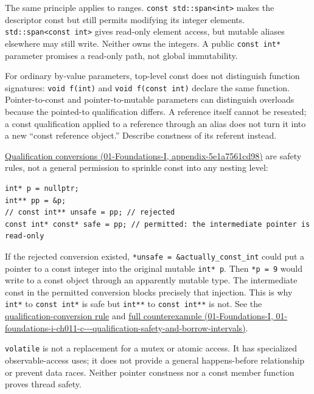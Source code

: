 The same principle applies to ranges. \texttt{const\ std::span\textless{}int\textgreater{}} makes the descriptor const but still permits modifying its integer elements. \texttt{std::span\textless{}const\ int\textgreater{}} gives read-only element access, but mutable aliases elsewhere may still write. Neither owns the integers. A public \texttt{const\ int*} parameter promises a read-only path, not global immutability.

For ordinary by-value parameters, top-level const does not distinguish function signatures: \texttt{void\ f(int)} and \texttt{void\ f(const\ int)} declare the same function. Pointer-to-const and pointer-to-mutable parameters can distinguish overloads because the pointed-to qualification differs. A reference itself cannot be reseated; a const qualification applied to a reference through an alias does not turn it into a new ``const reference object.'' Describe constness of its referent instead.

\href{../01-Foundations-I/main.pdf\#nameddest=appendix-5e1a7561cd98}{Qualification conversions (01-Foundations-I, appendix-5e1a7561cd98)} are safety rules, not a general permission to sprinkle const into any nesting level:

\begin{verbatim}
int* p = nullptr;
int** pp = &p;
// const int** unsafe = pp; // rejected
const int* const* safe = pp; // permitted: the intermediate pointer is read-only
\end{verbatim}

If the rejected conversion existed, \texttt{*unsafe\ =\ \&actually\_const\_int} could put a pointer to a const integer into the original mutable \texttt{int*\ p}. Then \texttt{*p\ =\ 9} would write to a const object through an apparently mutable type. The intermediate const in the permitted conversion blocks precisely that injection. This is why \texttt{int*} to \texttt{const\ int*} is safe but \texttt{int**} to \texttt{const\ int**} is not. See the \href{https://eel.is/c++draft/conv.qual}{qualification-conversion rule} and \href{../01-Foundations-I/main.pdf\#nameddest=01-foundations-i-ch011-c---qualification-safety-and-borrow-intervals}{full counterexample (01-Foundations-I, 01-foundations-i-ch011-c-\/-\/-qualification-safety-and-borrow-intervals)}.

\texttt{volatile} is not a replacement for a mutex or atomic access. It has specialized observable-access uses; it does not provide a general happens-before relationship or prevent data races. Neither pointer constness nor a const member function proves thread safety.

